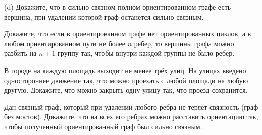 \noindent
(d) Докажите, что в сильно связном полном ориентированном графе есть вершина, при удалении которой граф останется сильно связным.

Докажите, что если в ориентированном графе нет ориентированных циклов, а в любом ориентированном пути не более $n$ ребер, то вершины графа можно разбить на $n+1$ группу так, чтобы внутри каждой группы не было ребер.

В городе на каждую площадь выходит не менее трёх улиц. На улицах введено одностороннее движение так, что можно проехать с любой площади на любую другую. Докажите, что можно закрыть одну улицу так, что проезд сохранится.

Дан связный граф, который при удалении любого ребра не теряет связность (граф без мостов). Докажите, что на всех его ребрах можно расставить ориентацию так, чтобы полученный ориентированный граф был сильно связным.